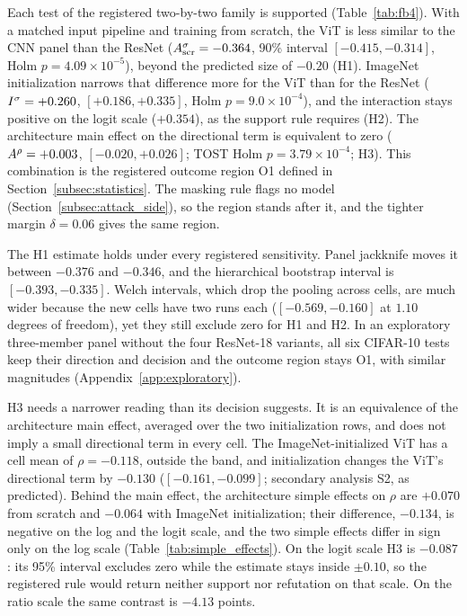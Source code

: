 Each test of the registered two-by-two family is supported (Table~\ref{tab:fb4}). With a matched input pipeline and training from scratch, the ViT is less similar to the CNN panel than the ResNet ($A^{\sigma}_{\mathrm{scr}} = -0.364$, 90\% interval $[-0.415, -0.314]$, Holm $p = 4.09\times10^{-5}$), beyond the predicted size of $-0.20$ (H1). ImageNet initialization narrows that difference more for the ViT than for the ResNet ($I^{\sigma} = +0.260$, $[+0.186, +0.335]$, Holm $p = 9.0\times10^{-4}$), and the interaction stays positive on the logit scale ($+0.354$), as the support rule requires (H2). The architecture main effect on the directional term is equivalent to zero ($A^{\rho} = +0.003$, $[-0.020, +0.026]$; TOST Holm $p = 3.79\times10^{-4}$; H3). This combination is the registered outcome region O1 defined in Section~\ref{subsec:statistics}. The masking rule flags no model (Section~\ref{subsec:attack_side}), so the region stands after it, and the tighter margin $\delta = 0.06$ gives the same region.

The H1 estimate holds under every registered sensitivity. Panel jackknife moves it between $-0.376$ and $-0.346$, and the hierarchical bootstrap interval is $[-0.393, -0.335]$. Welch intervals, which drop the pooling across cells, are much wider because the new cells have two runs each ($[-0.569, -0.160]$ at $1.10$ degrees of freedom), yet they still exclude zero for H1 and H2. In an exploratory three-member panel without the four ResNet-18 variants, all six CIFAR-10 tests keep their direction and decision and the outcome region stays O1, with similar magnitudes (Appendix~\ref{app:exploratory}).

H3 needs a narrower reading than its decision suggests. It is an equivalence of the architecture main effect, averaged over the two initialization rows, and does not imply a small directional term in every cell. The ImageNet-initialized ViT has a cell mean of $\rho = -0.118$, outside the band, and initialization changes the ViT's directional term by $-0.130$ ($[-0.161, -0.099]$; secondary analysis S2, as predicted). Behind the main effect, the architecture simple effects on $\rho$ are $+0.070$ from scratch and $-0.064$ with ImageNet initialization; their difference, $-0.134$, is negative on the log and the logit scale, and the two simple effects differ in sign only on the log scale (Table~\ref{tab:simple_effects}). On the logit scale H3 is $-0.087$: its 95\% interval excludes zero while the estimate stays inside $\pm0.10$, so the registered rule would return neither support nor refutation on that scale. On the ratio scale the same contrast is $-4.13$ points.

